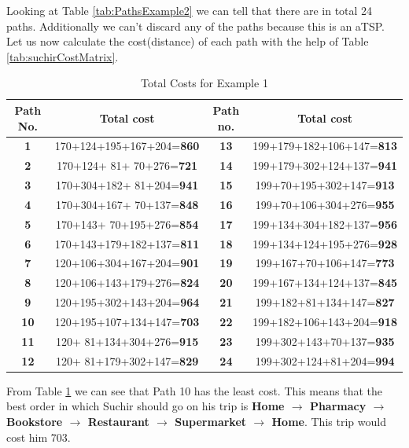 \documentclass[a4paper]{article}
\begin{document}
Looking at Table \ref{tab:PathsExample2} we can tell that there are in total 24 paths. Additionally we can't discard any of the paths because this is an aTSP. Let us now calculate the cost(distance) of each path with the help of Table \ref{tab:suchirCostMatrix}.
\begin{table}[H]
    \centering
    \begin{tabular}{|c|c|c|c|}
    \hline
    Path No. & Total cost & Path no. & Total cost\\ 
    \hline
    \textbf{1} & 170+124+195+167+204=\textbf{860} & \textbf{13} & 199+179+182+106+147=\textbf{813}\\
    \textbf{2} & 170+124+ 81+ 70+276=\textbf{721} & \textbf{14} & 199+179+302+124+137=\textbf{941}\\
    \textbf{3} & 170+304+182+ 81+204=\textbf{941} & \textbf{15} & 199+70+195+302+147=\textbf{913}\\
    \textbf{4} & 170+304+167+ 70+137=\textbf{848} & \textbf{16} & 199+70+106+304+276=\textbf{955}\\
    \textbf{5} & 170+143+ 70+195+276=\textbf{854} & \textbf{17} & 199+134+304+182+137=\textbf{956}\\
    \textbf{6} & 170+143+179+182+137=\textbf{811} & \textbf{18} & 199+134+124+195+276=\textbf{928}\\
    \textbf{7} & 120+106+304+167+204=\textbf{901} & \textbf{19} & 199+167+70+106+147=\textbf{773}\\
    \textbf{8} & 120+106+143+179+276=\textbf{824} & \textbf{20} & 199+167+134+124+137=\textbf{845}\\
    \textbf{9} & 120+195+302+143+204=\textbf{964} & \textbf{21} & 199+182+81+134+147=\textbf{827}\\
    \textbf{10}& 120+195+107+134+147=\textbf{703} & \textbf{22} & 199+182+106+143+204=\textbf{918}\\
    \textbf{11}& 120+ 81+134+304+276=\textbf{915} & \textbf{23} & 199+302+143+70+137=\textbf{935}\\
    \textbf{12}& 120+ 81+179+302+147=\textbf{829} & \textbf{24} & 199+302+124+81+204=\textbf{994}\\
    \hline
    \end{tabular}
    \caption{Total Costs for Example 1}
    \label{tab:suchirTotalCosts}
\end{table}
From Table \ref{tab:suchirTotalCosts} we can see that Path 10 has the least cost. This means that the best order in which Suchir should go on his trip is \textbf{Home $\to$ Pharmacy $\to$ Bookstore $\to$ Restaurant $\to$ Supermarket $\to$ Home}. This trip would cost him 703.\\
\end{document}
